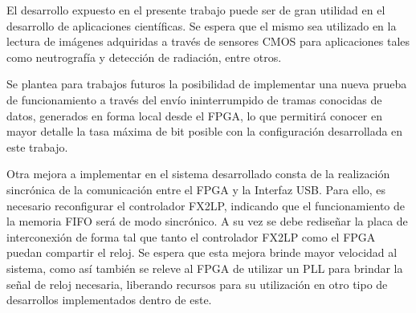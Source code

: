 El desarrollo expuesto en el presente trabajo puede ser de gran utilidad en el desarrollo de aplicaciones científicas. Se espera que el mismo sea utilizado en la lectura de imágenes adquiridas a través de sensores CMOS para aplicaciones tales como neutrografía y detección de radiación, entre otros.

Se plantea para trabajos futuros la posibilidad de implementar una nueva prueba de funcionamiento a través del envío ininterrumpido de tramas conocidas de datos, generados en forma local desde el FPGA, lo que permitirá conocer en mayor detalle la tasa máxima de bit posible con la configuración desarrollada en este trabajo.

Otra mejora a implementar en el sistema desarrollado consta de la realización sincrónica de la comunicación entre el FPGA y la Interfaz USB. Para ello, es necesario reconfigurar el controlador FX2LP, indicando que el funcionamiento de la memoria FIFO será de modo sincrónico. A su vez se debe rediseñar la placa de interconexión de forma tal que tanto el controlador FX2LP como el FPGA puedan compartir el reloj. Se espera que esta mejora brinde mayor velocidad al sistema, como así también se releve al FPGA de utilizar un PLL para brindar la señal de reloj necesaria, liberando recursos para su utilización en otro tipo de desarrollos implementados dentro de este.